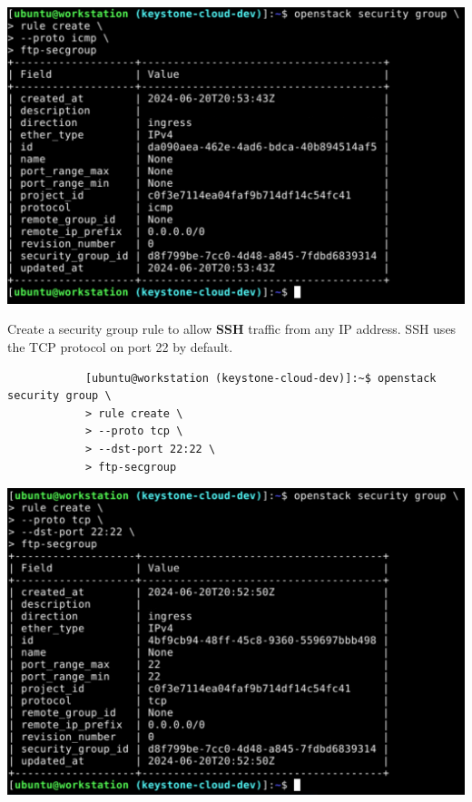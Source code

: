 \documentclass[letterpaper, 12pt]{article}
\begin{document}
\begin{enumerate}
\begin{labstep}
        \begin{center}
            \includegraphics[width=\linewidth]{images/part1/step33.png}
        \end{center}
    \end{labstep}

    \begin{labstep}
        Create a security group rule to allow \textbf{SSH} traffic from any IP address.
        SSH uses the TCP protocol on port 22 by default.
        \begin{lstlisting}
            [ubuntu@workstation (keystone-cloud-dev)]:~$ openstack security group \
            > rule create \
            > --proto tcp \
            > --dst-port 22:22 \
            > ftp-secgroup
        \end{lstlisting}

        \begin{center}
            \includegraphics[width=\linewidth]{images/part1/step34.png}
        \end{center}
    \end{labstep}


\end{enumerate}
\end{document}
